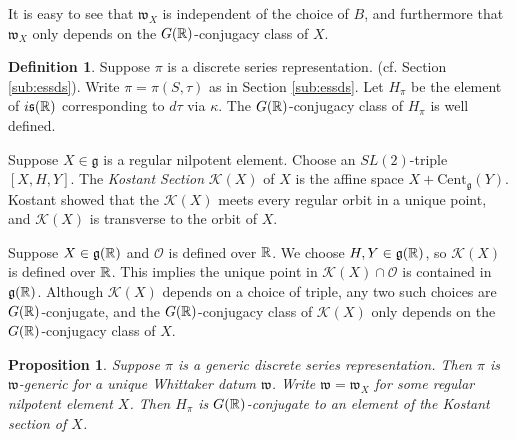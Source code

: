 \documentclass{article}
\newtheorem{pro}[thm]{Proposition}
\theoremstyle{definition}
\newtheorem{dfn}[thm]{Definition}
\numberwithin{equation}{section}
\renewcommand{\-}{\hyp{}}
\newcommand{\s}{\mathfrak s}
\newcommand{\g}{\mathfrak g}
\renewcommand{\O}{\mathcal O}
\newcommand{\K}{\mathcal K}
\newcommand{\w}{\mathfrak w}
\newcommand{\Cent}{\mathrm{Cent}}
\begin{document}
It is easy to see that $\w_X$ is independent of the choice of $B$, and furthermore that $\w_X$ only depends 
on the $G(\mathbb{R})$-conjugacy class of $X$.

\begin{dfn}
Suppose $\pi$ is a  discrete series representation. (cf. Section \ref{sub:essds}).
Write $\pi=\pi(S,\tau)$ as in Section  \ref{sub:essds}.
Let $H_\pi$ be the element of $i\s(\R)$ corresponding to $d\tau$ via $\kappa$.
The $G(\mathbb{R})$-conjugacy class of $H_\pi$ is well defined.
\end{dfn}

Suppose $X\in\g$ is a regular nilpotent element. Choose an
$SL(2)$-triple $[X,H,Y]$.  The {\it Kostant Section} $\K(X)$ of
$X$ is the affine space $X+\Cent_\g(Y)$.
Kostant showed \cite{Kos63} that the $\K(X)$ meets every regular orbit in a unique point, and 
$\K(X)$ is transverse to the orbit of $X$.


Suppose $X\in \g(\R)$ and $\O$ is defined over $\mathbb{R}$.
We  choose $H,Y\in \g(\R)$, so $\K(X)$ is defined over $\mathbb{R}$. This implies
the unique point in $\K(X)\cap \O$ is contained in $\g(\R)$.
Although $\K(X)$ depends on a choice of
triple,  any two such choices are $G(\mathbb{R})$-conjugate, and the
$G(\mathbb{R})$-conjugacy class of $\K(X)$ only depends on the $G(\mathbb{R})$-conjugacy class of
$X$.


\begin{pro}
  \label{p:whittaker}
Suppose $\pi$ is a generic discrete series representation. Then $\pi$ is $\w$-generic
for a unique Whittaker datum $\w$.
Write $\w=\w_X$ for some regular nilpotent element $X$.
Then $H_\pi$ is $G(\mathbb{R})$-conjugate to an element of the Kostant section of $X$.
\end{pro}
\end{document}
